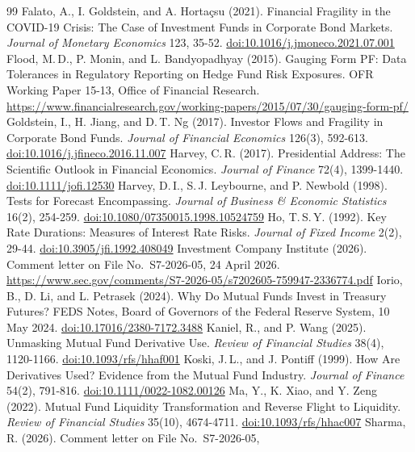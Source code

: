 \documentclass[11pt]{article}
\newcommand{\doi}[1]{\href{https://doi.org/#1}{doi:#1}}
\begin{document}
\begin{thebibliography}{99}
 Falato, A., I. Goldstein, and A. Hortaçsu (2021). Financial Fragility in the COVID-19 Crisis: The Case of Investment Funds in Corporate Bond Markets. \emph{Journal of Monetary Economics} 123, 35-52. \doi{10.1016/j.jmoneco.2021.07.001}
 Flood, M.\,D., P. Monin, and L. Bandyopadhyay (2015). Gauging Form PF: Data Tolerances in Regulatory Reporting on Hedge Fund Risk Exposures. OFR Working Paper 15-13, Office of Financial Research. \url{https://www.financialresearch.gov/working-papers/2015/07/30/gauging-form-pf/}
 Goldstein, I., H. Jiang, and D.\,T. Ng (2017). Investor Flows and Fragility in Corporate Bond Funds. \emph{Journal of Financial Economics} 126(3), 592-613. \doi{10.1016/j.jfineco.2016.11.007}
 Harvey, C.\,R. (2017). Presidential Address: The Scientific Outlook in Financial Economics. \emph{Journal of Finance} 72(4), 1399-1440. \doi{10.1111/jofi.12530}
 Harvey, D.\,I., S.\,J. Leybourne, and P. Newbold (1998). Tests for Forecast Encompassing. \emph{Journal of Business \& Economic Statistics} 16(2), 254-259. \doi{10.1080/07350015.1998.10524759}
 Ho, T.\,S.\,Y. (1992). Key Rate Durations: Measures of Interest Rate Risks. \emph{Journal of Fixed Income} 2(2), 29-44. \doi{10.3905/jfi.1992.408049}
 Investment Company Institute (2026).
Comment letter on File No.\ S7-2026-05, 24 April 2026.
\url{https://www.sec.gov/comments/S7-2026-05/s7202605-759947-2336774.pdf}
 Iorio, B., D. Li, and L. Petrasek (2024). Why Do Mutual Funds Invest in Treasury Futures? FEDS Notes, Board of Governors of the Federal Reserve System, 10 May 2024. \doi{10.17016/2380-7172.3488}
 Kaniel, R., and P. Wang (2025). Unmasking Mutual Fund Derivative Use. \emph{Review of Financial Studies} 38(4), 1120-1166. \doi{10.1093/rfs/hhaf001}
 Koski, J.\,L., and J. Pontiff (1999). How Are Derivatives Used? Evidence from the Mutual Fund Industry. \emph{Journal of Finance} 54(2), 791-816. \doi{10.1111/0022-1082.00126}
 Ma, Y., K. Xiao, and Y. Zeng (2022). Mutual Fund Liquidity Transformation and Reverse Flight to Liquidity. \emph{Review of Financial Studies} 35(10), 4674-4711. \doi{10.1093/rfs/hhac007}
 Sharma, R. (2026). Comment letter on File No.\ S7-2026-05,

\end{thebibliography}
\end{document}

